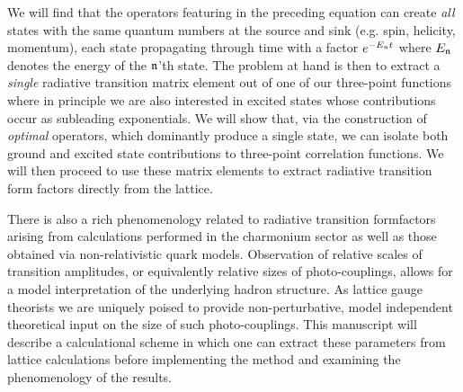 We will find that the operators featuring in the preceding equation can create \emph{all} states with the same quantum numbers at the source and sink (e.g. spin, helicity, momentum), each state propagating through time with a factor $e^{-E_{\mathfrak{n}}t}$ where $E_{\mathfrak{n}}$ denotes the energy of the $\mathfrak{n}$'th state.  The problem at hand is then to extract a \emph{single} radiative transition matrix element out of one of our three-point functions where in principle we are also interested in excited states whose contributions occur as subleading exponentials. We will show that, via the construction of \emph{optimal} operators, which dominantly produce a single state, we can isolate both ground and excited state contributions to three-point correlation functions. We will then proceed to use these matrix elements to extract radiative transition form factors directly from the lattice. 

There is also a rich phenomenology related to radiative transition formfactors arising from calculations performed in the charmonium sector as well as those obtained via non-relativistic quark models. Observation of relative scales of transition amplitudes, or equivalently relative sizes of photo-couplings, allows for a model interpretation of the underlying hadron structure.   As lattice gauge theorists we are uniquely poised to provide non-perturbative, model independent theoretical input on the size of such photo-couplings.  This manuscript will describe a calculational scheme in which one can extract these parameters from lattice calculations before implementing the method and examining the phenomenology of the results. 








 
